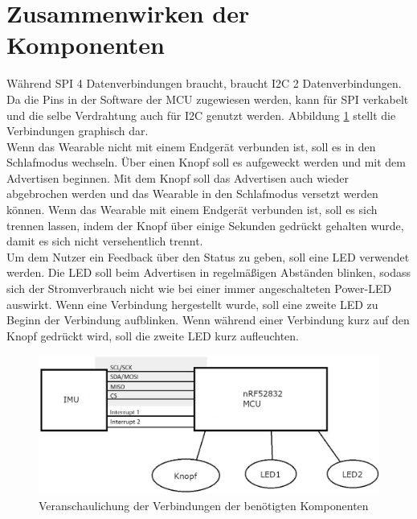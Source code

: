 \section{Zusammenwirken der Komponenten}
Während SPI 4 Datenverbindungen braucht, braucht I2C 2 Datenverbindungen.
Da die Pins in der Software der MCU zugewiesen werden, kann für SPI verkabelt und die selbe Verdrahtung auch für I2C genutzt werden.
Abbildung \ref{fig:abstract_schema} stellt die Verbindungen graphisch dar.\\
Wenn das Wearable nicht mit einem Endgerät verbunden ist, soll es in den Schlafmodus wechseln.
Über einen Knopf soll es aufgeweckt werden und mit dem Advertisen beginnen.
Mit dem Knopf soll das Advertisen auch wieder abgebrochen werden und das Wearable in den Schlafmodus versetzt werden können.
Wenn das Wearable mit einem Endgerät verbunden ist, soll es sich trennen lassen, indem der Knopf über einige Sekunden gedrückt gehalten wurde, damit es sich nicht versehentlich trennt.\\
Um dem Nutzer ein Feedback über den Status zu geben, soll eine LED verwendet werden.
Die LED soll beim Advertisen in regelmäßigen Abständen blinken, sodass sich der Stromverbrauch nicht wie bei einer immer angeschalteten Power-LED auswirkt.
Wenn eine Verbindung hergestellt wurde, soll eine zweite LED zu Beginn der Verbindung aufblinken.
Wenn während einer Verbindung kurz auf den Knopf gedrückt wird, soll die zweite LED kurz aufleuchten.
\begin{figure}[hbtp]
	\centering
	\includegraphics[width=0.9\linewidth]{res/schemaAbstrakt.jpg}
	\caption{Veranschaulichung der Verbindungen der benötigten Komponenten}
	\label{fig:abstract_schema}
\end{figure}

